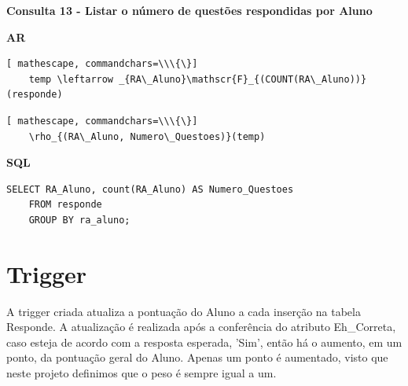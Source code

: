 \documentclass[12pt,a4paper]{article}
\begin{document}
\vspace{0.5cm}
\begin{center}
    \textbf{Consulta 13 - Listar o número de questões respondidas por Aluno}
\end{center}
\begin{center}
    \textbf{AR}
\end{center}

\begin{Verbatim}[ mathescape, commandchars=\\\{\}]
    temp \leftarrow _{RA\_Aluno}\mathscr{F}_{(COUNT(RA\_Aluno))}(responde)
\end{Verbatim}
\begin{Verbatim}[ mathescape, commandchars=\\\{\}]
    \rho_{(RA\_Aluno, Numero\_Questoes)}(temp)
\end{Verbatim}

\begin{center}
    \textbf{SQL}
\end{center}
\begin{Verbatim}[commandchars=\\\{\}]
    SELECT RA_Aluno, count(RA_Aluno) AS Numero_Questoes 
    FROM responde 
    GROUP BY ra_aluno;
\end{Verbatim}

\newpage
\section{Trigger}

A trigger criada atualiza a pontuação do Aluno a cada inserção na tabela Responde. A atualização é realizada após a conferência do atributo Eh\_Correta, caso esteja de acordo com a resposta esperada, 'Sim', então há o aumento, em um ponto, da pontuação geral do Aluno. Apenas um ponto é aumentado, visto que neste projeto definimos que o peso é sempre igual a um.\\
\end{document}
